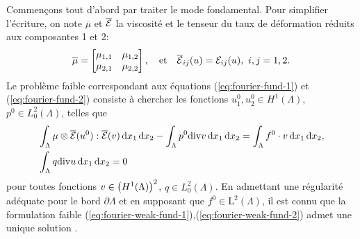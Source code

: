 Commençons tout d'abord par traiter le mode fondamental. Pour
simplifier l'écriture, on note $\overline{\mu}$ et
$\overline{\mathcal E}$ la viscosité et le tenseur du taux de
déformation réduits aux composantes 1 et 2:
\begin{equation}
 \overline{\mu} = \begin{bmatrix}
  \mu_{1,1} & \mu_{1,2} \\
  \mu_{2,1} & \mu_{2,2}
 \end{bmatrix},\quad \text{et} \quad \overline{\mathcal E}_{ij}(u) =
 \mathcal E_{ij}(u),\ i,j = 1,2.
\end{equation}
Le problème faible correspondant aux équations
(\ref{eq:fourier-fund-1}) et (\ref{eq:fourier-fund-2}) consiste à
chercher les fonctions $u_1^0,u_2^0 \in H^1(\Lambda)$, $p^0 \in
L^2_0(\Lambda)$, telles que
\begin{align}
  &\int_\Lambda \mu\otimes \overline{\mathcal E}(u^0) : \overline{\mathcal E}(v) \,\mathrm dx_1\,\mathrm dx_2 -
  \int_\Lambda p^0\mathrm{div} v \,\mathrm dx_1\,\mathrm dx_2 = \int_\Lambda f^0\cdot v
  \,\mathrm dx_1\,\mathrm dx_2,\label{eq:fourier-weak-fund-1}\\
  &\int_\Lambda q\mathrm{div} u \,\mathrm dx_1\,\mathrm dx_2 = 0\label{eq:fourier-weak-fund-2}
\end{align}
pour toutes fonctions $v \in \left( H^1(\Lambda) \right)^2$, $q \in
L_0^2(\Lambda)$. En admettant une régularité adéquate pour le bord
$\partial \Lambda$ et en supposant que $f^0\in \mathrm L^2(\Lambda)$,
il est connu que la formulation faible
(\ref{eq:fourier-weak-fund-1}),(\ref{eq:fourier-weak-fund-2}) admet une unique
solution \cite{Temam1977}.

